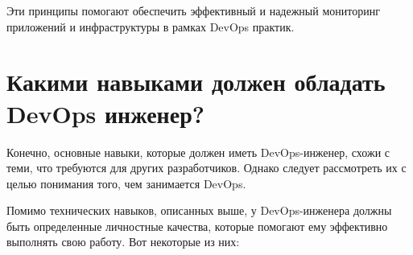 \documentclass[referat]{SCWorks}
\begin{document}
Эти принципы помогают обеспечить эффективный и надежный мониторинг приложений и инфраструктуры в рамках DevOps практик.

\section{Какими навыками должен обладать DevOps инженер?}

Конечно, основные навыки, которые должен иметь DevOps-инженер, схожи с теми, что требуются для других разработчиков. Однако следует рассмотреть их с целью понимания того, чем занимается DevOps. 

Помимо технических навыков, описанных выше, у DevOps-инженера должны быть определенные личностные качества, которые помогают ему эффективно выполнять свою работу. Вот некоторые из них:
\end{document}
